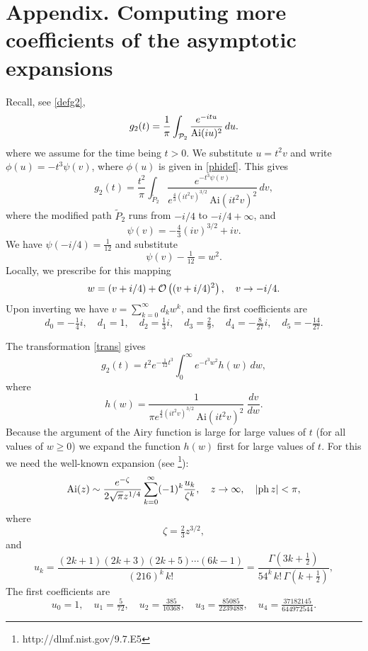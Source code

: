\documentclass[11pt]{article}
\begin{document}
\section{Appendix. Computing more coefficients of the asymptotic expansions}
\label{more}
Recall, see \eqref{defg2},
$$
g_2(t)=\frac{1}{\pi}\int_{{{\cal P}}_2}\frac{e^{-itu}}{{\mbox{Ai}}(iu)^2}\,du.
$$
where we assume for the time being $t > 0$. We substitute $u=t^2 v$ and  write $\phi(u)=-t^3\psi(v)$, where $\phi(u)$ is given in \eqref{phidef}. This gives
$$
g_2(t)=\frac{t^2}{\pi}\int_{\widetilde{P}_2}\frac{e^{-t^3\psi(v)}}{e^{\tfrac43(it^2v)^{3/2}}\,{\mbox{Ai}}(it^2v)^2}\,dv,
$$
where the modified path $\widetilde{P}_2$ runs from $-i/4$ to $-i/4+\infty$, and
$$
\psi(v)= -\tfrac43(iv)^{3/2}+iv.
$$
We have $\psi(-i/4)=\frac{1}{12}$ and substitute
\begin{equation}
\label{trans}
\psi(v)-\tfrac1{12}=w^2.
\end{equation}
Locally, we prescribe for this mapping 
$$
w= (v+i/4)+{{\cal O}}\left((v+i/4)^2\right), \quad v\to-i/4.
$$
Upon inverting we have $v=\sum_{k=0}^\infty d_kw^k$, and the first coefficients are
$$
d_0=-\tfrac14i,\quad 
d_1=1, \quad
d_2=\tfrac{1}{3}i, \quad
d_3=\tfrac{2}{9},\quad
d_4=-\tfrac{8}{27}i,\quad
d_5=-\tfrac{14}{27}.
$$ 

The transformation \eqref{trans} gives
\begin{equation}
\label{trans2}
g_2(t)=t^2e^{-\frac1{12}t^3}\int_0^\infty e^{-t^3w^2} h(w)\,dw,
\end{equation}
where
$$
h(w)=\frac{1}{\pi e^{\frac43(it^2v)^{3/2}}\,{\mbox{Ai}}(it^2v)^2}\ \frac{dv}{dw}.
$$
Because the argument of the Airy function is large for large values of $t$ (for all values of $w\ge0$) we expand the function $h(w)$ first for large values of $t$. For this we need the well-known expansion  (see {{\small \sc {}}}\footnote{http://dlmf.nist.gov/9.7.E5}):
\begin{equation}
\label{Airy_asymp1}
{\mbox{Ai}}(z)\sim\frac{e^{{-\zeta}}}{2\sqrt{\pi}z^{{1/4}}}
\sum _{{k=0}}^{{\infty}}(-1)^{k}\frac{u_{k}}{\zeta^{k}},
\quad z\to\infty, 
\quad \vert{{\rm ph}}\,z\vert<\pi,
\end{equation}
where 
$$
\zeta=\tfrac23z^{3/2},
$$
and
$$
u_{k}=\frac{(2k+1)(2k+3)(2k+5)\cdots(6k-1)}{(216)^{k}\,k!}=\frac{\Gamma(3k+\frac12)}{54^k\,k!\,\Gamma(k+\frac12)},
$$
The first coefficients are
$$
u_0=1,\quad 
u_1=\tfrac{5}{72}, \quad
u_2=\tfrac{385}{10368}, \quad
u_3=\tfrac{85085}{2239488}, \quad
u_4=\tfrac{37182145}{644972544}. 
$$ 
\end{document}
